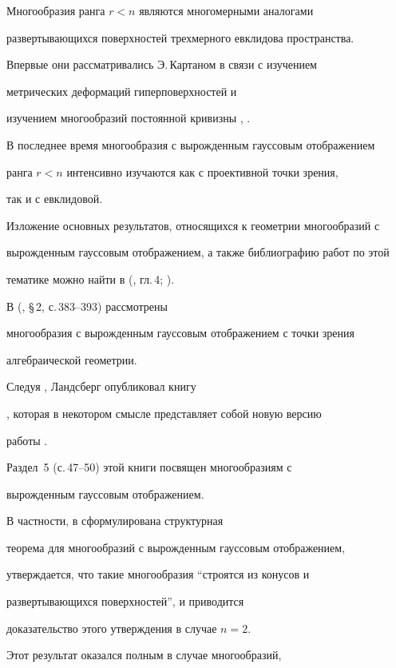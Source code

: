 Многообразия ранга  $r < n$ являются многомерными аналогами


развертывающихся поверхностей трехмерного евклидова пространства.


Впервые они рассматривались Э.\,Картаном в связи с изучением


метрических деформаций гиперповерхностей \cite{C16} и


изучением многообразий постоянной кривизны \cite{C19}, \cite{C20}.


В последнее время многообразия с вырожденным гауссовым отображением


ранга $r < n$ интенсивно изучаются как с проективной точки зрения,


так и с евклидовой.





Изложение основных результатов, относящихся к геометрии многообразий с


вырожденным гауссовым отображением, а также библиографию работ по этой


тематике можно найти в  (\cite{AG93}, гл.\,4; \cite{AG01b}).





В (\cite{GH79}, \S\,2, с.\,383--393) рассмотрены


многообразия с вырожденным гауссовым отображением с точки зрения


алгебраической геометрии.


Следуя \cite{GH79}, Ландсберг опубликовал книгу


\cite{L99}, которая в некотором смысле представляет собой новую версию


работы \cite{GH79}.


Раздел~5 (с.\,47--50) этой книги посвящен многообразиям с


вырожденным гауссовым отображением.





В частности, в \cite{GH79} сформулирована структурная


теорема для многообразий с вырожденным гауссовым отображением,


утверждается, что такие многообразия ``строятся из конусов и


развертывающихся поверхностей'', и приводится


доказательство этого утверждения в случае  $n=2$.


Этот результат оказался полным в случае многообразий,


